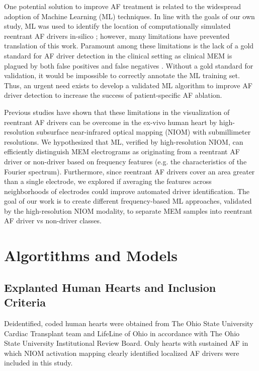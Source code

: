 \documentclass{article}
\begin{document}
One potential solution to improve AF treatment is related to the widespread adoption of Machine Learning (ML) techniques. In line with the goals of our own study, ML was used to identify the location of computationally simulated reentrant AF drivers in-silico \cite{McGillivray2018}; however, many limitations have prevented translation of this work. Paramount among these limitations is the lack of a gold standard for AF driver detection in the clinical setting as clinical MEM is plagued by both false positives and false negatives \cite{Benharash2015, Hansen2018, Vijayakumar2016}. Without a gold standard for validation, it would be impossible to correctly annotate the ML training set. Thus, an urgent need exists to develop a validated ML algorithm to improve AF driver detection to increase the success of patient-specific AF ablation. 

Previous studies \cite{Hansen2015, Hansen2018, Zhao2017} have shown that these limitations in the visualization of reentrant AF drivers can be overcome in the ex-vivo human heart by high-resolution subsurface near-infrared optical mapping (NIOM) with submillimeter resolutions. We hypothesized that ML, verified by high-resolution NIOM, can efficiently distinguish MEM electrograms as originating from a reentrant AF driver or non-driver based on frequency features (e.g. the characteristics of the Fourier spectrum). Furthermore, since reentrant AF drivers cover an area greater than a single electrode, we explored if averaging the features across neighborhoods of electrodes could improve automated driver identification. 
The goal of our work is to create different frequency-based ML approaches, validated by the high-resolution NIOM modality, to separate MEM samples into reentrant AF driver vs non-driver classes.

\section{Algortithms and Models}
\label{submission}

\subsection{Explanted Human Hearts and Inclusion Criteria}

Deidentified, coded human hearts were obtained from The Ohio State University Cardiac Transplant team and LifeLine of Ohio in accordance with The Ohio State University Institutional Review Board. Only hearts with sustained AF in which NIOM activation mapping clearly identified localized AF drivers were included in this study.
\end{document}
